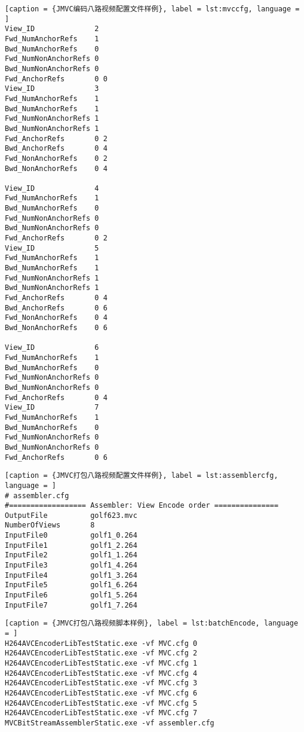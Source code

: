 \begin{lstlisting}[caption = {JMVC编码八路视频配置文件样例}, label = lst:mvccfg, language = ]
View_ID              2
Fwd_NumAnchorRefs    1
Bwd_NumAnchorRefs    0
Fwd_NumNonAnchorRefs 0
Bwd_NumNonAnchorRefs 0
Fwd_AnchorRefs       0 0
View_ID              3
Fwd_NumAnchorRefs    1
Bwd_NumAnchorRefs    1
Fwd_NumNonAnchorRefs 1
Bwd_NumNonAnchorRefs 1
Fwd_AnchorRefs       0 2
Bwd_AnchorRefs       0 4
Fwd_NonAnchorRefs    0 2
Bwd_NonAnchorRefs    0 4

View_ID              4
Fwd_NumAnchorRefs    1
Bwd_NumAnchorRefs    0
Fwd_NumNonAnchorRefs 0
Bwd_NumNonAnchorRefs 0
Fwd_AnchorRefs       0 2
View_ID              5
Fwd_NumAnchorRefs    1
Bwd_NumAnchorRefs    1
Fwd_NumNonAnchorRefs 1
Bwd_NumNonAnchorRefs 1
Fwd_AnchorRefs       0 4
Bwd_AnchorRefs       0 6
Fwd_NonAnchorRefs    0 4
Bwd_NonAnchorRefs    0 6

View_ID              6
Fwd_NumAnchorRefs    1
Bwd_NumAnchorRefs    0
Fwd_NumNonAnchorRefs 0
Bwd_NumNonAnchorRefs 0
Fwd_AnchorRefs       0 4
View_ID              7
Fwd_NumAnchorRefs    1
Bwd_NumAnchorRefs    0
Fwd_NumNonAnchorRefs 0
Bwd_NumNonAnchorRefs 0
Fwd_AnchorRefs       0 6
\end{lstlisting}

\begin{lstlisting}[caption = {JMVC打包八路视频配置文件样例}, label = lst:assemblercfg, language = ]
# assembler.cfg
#================== Assembler: View Encode order ===============
OutputFile          golf623.mvc
NumberOfViews       8
InputFile0          golf1_0.264
InputFile1          golf1_2.264
InputFile2          golf1_1.264
InputFile3          golf1_4.264
InputFile4          golf1_3.264
InputFile5          golf1_6.264
InputFile6          golf1_5.264
InputFile7          golf1_7.264
\end{lstlisting}

\begin{lstlisting}[caption = {JMVC打包八路视频脚本样例}, label = lst:batchEncode, language = ]
H264AVCEncoderLibTestStatic.exe -vf MVC.cfg 0
H264AVCEncoderLibTestStatic.exe -vf MVC.cfg 2
H264AVCEncoderLibTestStatic.exe -vf MVC.cfg 1
H264AVCEncoderLibTestStatic.exe -vf MVC.cfg 4
H264AVCEncoderLibTestStatic.exe -vf MVC.cfg 3
H264AVCEncoderLibTestStatic.exe -vf MVC.cfg 6
H264AVCEncoderLibTestStatic.exe -vf MVC.cfg 5
H264AVCEncoderLibTestStatic.exe -vf MVC.cfg 7
MVCBitStreamAssemblerStatic.exe -vf assembler.cfg
\end{lstlisting}

